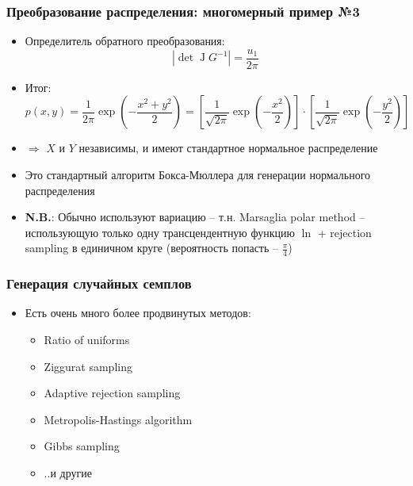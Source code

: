 \documentclass[handout,10pt]{beamer}
\begin{document}
\begin{frame}[fragile]
\frametitle{Преобразование распределения: многомерный пример №3}
\begin{itemize}
\item Определитель обратного преобразования:
\begin{equation*}
|\det \operatorname J G^{-1}| = \frac{u_1}{2 \pi}
\end{equation*}
\pause
\item Итог:
\begin{equation*}
p(x,y) = \frac{1}{2\pi}\exp\left(-\frac{x^2+y^2}{2}\right) = \left[\frac{1}{\sqrt{2\pi}}\exp\left(-\frac{x^2}{2}\right)\right] \cdot \left[\frac{1}{\sqrt{2\pi}}\exp\left(-\frac{y^2}{2}\right)\right]
\end{equation*}
\pause
\item \begin{math}\Longrightarrow\end{math} \begin{math}X\end{math} и \begin{math}Y\end{math} независимы, и имеют стандартное нормальное распределение
\pause
\item Это стандартный алгоритм Бокса-Мюллера для генерации нормального распределения
\pause
\item \alert{\textbf{N.B.}}: Обычно используют вариацию -- т.н. Marsaglia polar method -- использующую только одну трансцендентную функцию \begin{math}\ln\end{math} + rejection sampling в единичном круге (вероятность попасть -- \begin{math}\frac{\pi}{4}\end{math})
\end{itemize}
\end{frame}

\begin{frame}[fragile]
\frametitle{Генерация случайных семплов}
\begin{itemize}
\item Есть очень много более продвинутых методов:
\begin{itemize}
\item Ratio of uniforms
\item Ziggurat sampling
\item Adaptive rejection sampling
\item Metropolis-Hastings algorithm
\item Gibbs sampling
\item ..и другие
\end{itemize}
\end{itemize}
\end{frame}
\end{document}
